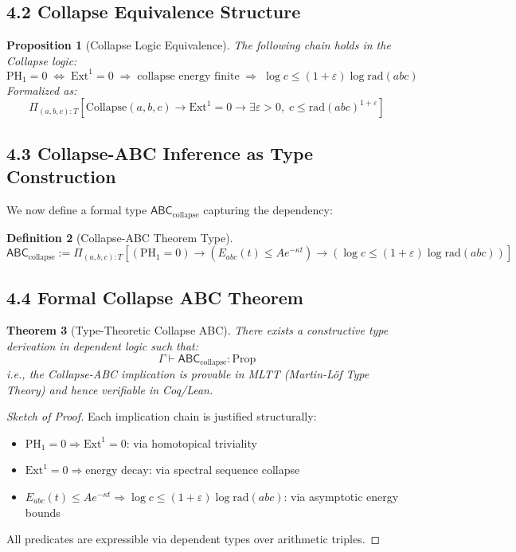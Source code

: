 \documentclass[11pt]{article}
\newtheorem{theorem}{Theorem}[section]
\newtheorem{definition}[theorem]{Definition}
\newtheorem{proposition}[theorem]{Proposition}
\begin{document}
\subsection{4.2 Collapse Equivalence Structure}

\begin{proposition}[Collapse Logic Equivalence]
The following chain holds in the Collapse logic:
\[
\mathrm{PH}_1 = 0 \;\Leftrightarrow\; \mathrm{Ext}^1 = 0 \;\Rightarrow\; \text{collapse energy finite} \;\Rightarrow\; \log c \leq (1+\varepsilon) \log \mathrm{rad}(abc)
\]
Formalized as:
\[
\Pi_{(a,b,c):T} \left[ \mathrm{Collapse}(a,b,c) \to \mathrm{Ext}^1 = 0 \to \exists \varepsilon > 0,\; c \leq \mathrm{rad}(abc)^{1+\varepsilon} \right]
\]
\end{proposition}

\subsection{4.3 Collapse-ABC Inference as Type Construction}

We now define a formal type \( \mathsf{ABC}_{\text{collapse}} \) capturing the dependency:

\begin{definition}[Collapse-ABC Theorem Type]
\[
\mathsf{ABC}_{\text{collapse}} := \Pi_{(a,b,c):T} \left[ 
\left( \mathrm{PH}_1 = 0 \right) \to 
\left( E_{abc}(t) \leq A e^{-\kappa t} \right) \to 
\left( \log c \leq (1+\varepsilon) \log \mathrm{rad}(abc) \right)
\right]
\]
\end{definition}

\subsection{4.4 Formal Collapse ABC Theorem}

\begin{theorem}[Type-Theoretic Collapse ABC]
There exists a constructive type derivation in dependent logic such that:
\[
\Gamma \vdash \mathsf{ABC}_{\text{collapse}} : \mathrm{Prop}
\]
i.e., the Collapse-ABC implication is provable in MLTT (Martin-Löf Type Theory) and hence verifiable in Coq/Lean.
\end{theorem}

\begin{proof}[Sketch of Proof]
Each implication chain is justified structurally:
\begin{itemize}
    \item \( \mathrm{PH}_1 = 0 \Rightarrow \mathrm{Ext}^1 = 0 \): via homotopical triviality
    \item \( \mathrm{Ext}^1 = 0 \Rightarrow \text{energy decay} \): via spectral sequence collapse
    \item \( E_{abc}(t) \leq A e^{-\kappa t} \Rightarrow \log c \leq (1+\varepsilon) \log \mathrm{rad}(abc) \): via asymptotic energy bounds
\end{itemize}
All predicates are expressible via dependent types over arithmetic triples.
\end{proof}
\end{document}
